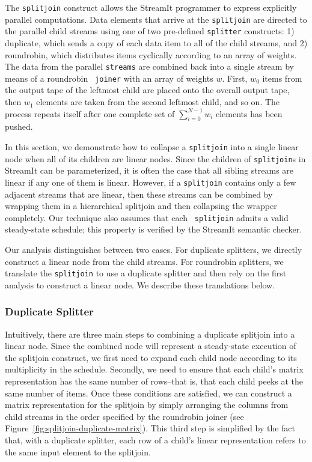 The {\tt splitjoin} construct allows the StreamIt programmer to
express explicitly parallel computations.  Data elements that arrive
at the {\tt splitjoin} are directed to the parallel child streams
using one of two pre-defined {\tt splitter} constructs: 1) duplicate,
which sends a copy of each data item to all of the child streams, and
2) roundrobin, which distributes items cyclically according to an
array of weights.  The data from the parallel {\tt streams} are
combined back into a single stream by means of a roundrobin {\tt
joiner} with an array of weights $w$.  First, $w_0$ items from the
output tape of the leftmost child are placed onto the overall output
tape, then $w_1$ elements are taken from the second leftmost child,
and so on.  The process repeats itself after one complete set of
$\sum_{i=0}^{N-1} w_i$ elements has been pushed.

In this section, we demonstrate how to collapse a {\tt splitjoin} into
a single linear node when all of its children are linear nodes.  Since
the children of {\tt splitjoin}s in StreamIt can be parameterized, it
is often the case that all sibling streams are linear if any one of
them is linear.  However, if a {\tt splitjoin} contains only a few
adjacent streams that are linear, then these streams can be combined
by wrapping them in a hierarchical splitjoin and then collapsing the
wrapper completely.  Our technique also assumes that each {\tt
splitjoin} admits a valid steady-state schedule; this property is
verified by the StreamIt semantic checker.

Our analysis distinguishes between two cases.  For duplicate
splitters, we directly construct a linear node from the child streams.
For roundrobin splitters, we translate the {\tt splitjoin} to use a
duplicate splitter and then rely on the first analysis to construct a
linear node.  We describe these translations below.

\subsubsection{Duplicate Splitter}

Intuitively, there are three main steps to combining a duplicate
splitjoin into a linear node.  Since the combined node will represent
a steady-state execution of the splitjoin construct, we first need to
expand each child node according to its multiplicity in the schedule.
Secondly, we need to ensure that each child's matrix representation
has the same number of rows--that is, that each child peeks at the
same number of items.  Once these conditions are satisfied, we can
construct a matrix representation for the splitjoin by simply
arranging the columns from child streams in the order specified by the
roundrobin joiner (see Figure~\ref{fig:splitjoin-duplicate-matrix}).
This third step is simplified by the fact that, with a duplicate
splitter, each row of a child's linear representation refers to the
same input element to the splitjoin.

